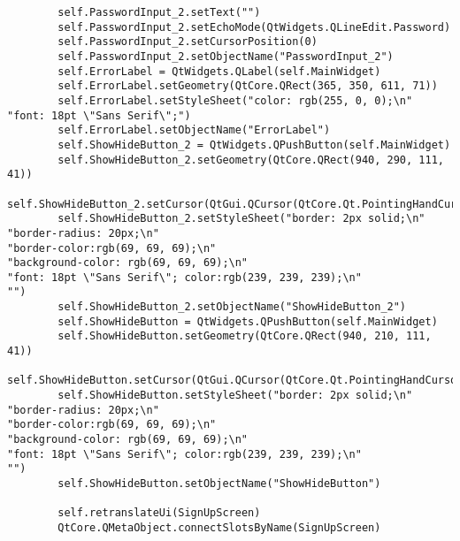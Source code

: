 \documentclass{article}
\begin{document}
\begin{lstlisting}
        self.PasswordInput_2.setText("")
        self.PasswordInput_2.setEchoMode(QtWidgets.QLineEdit.Password)
        self.PasswordInput_2.setCursorPosition(0)
        self.PasswordInput_2.setObjectName("PasswordInput_2")
        self.ErrorLabel = QtWidgets.QLabel(self.MainWidget)
        self.ErrorLabel.setGeometry(QtCore.QRect(365, 350, 611, 71))
        self.ErrorLabel.setStyleSheet("color: rgb(255, 0, 0);\n"
"font: 18pt \"Sans Serif\";")
        self.ErrorLabel.setObjectName("ErrorLabel")
        self.ShowHideButton_2 = QtWidgets.QPushButton(self.MainWidget)
        self.ShowHideButton_2.setGeometry(QtCore.QRect(940, 290, 111, 41))
        self.ShowHideButton_2.setCursor(QtGui.QCursor(QtCore.Qt.PointingHandCursor))
        self.ShowHideButton_2.setStyleSheet("border: 2px solid;\n"
"border-radius: 20px;\n"
"border-color:rgb(69, 69, 69);\n"
"background-color: rgb(69, 69, 69);\n"
"font: 18pt \"Sans Serif\"; color:rgb(239, 239, 239);\n"
"")
        self.ShowHideButton_2.setObjectName("ShowHideButton_2")
        self.ShowHideButton = QtWidgets.QPushButton(self.MainWidget)
        self.ShowHideButton.setGeometry(QtCore.QRect(940, 210, 111, 41))
        self.ShowHideButton.setCursor(QtGui.QCursor(QtCore.Qt.PointingHandCursor))
        self.ShowHideButton.setStyleSheet("border: 2px solid;\n"
"border-radius: 20px;\n"
"border-color:rgb(69, 69, 69);\n"
"background-color: rgb(69, 69, 69);\n"
"font: 18pt \"Sans Serif\"; color:rgb(239, 239, 239);\n"
"")
        self.ShowHideButton.setObjectName("ShowHideButton")

        self.retranslateUi(SignUpScreen)
        QtCore.QMetaObject.connectSlotsByName(SignUpScreen)


\end{lstlisting}
\end{document}
